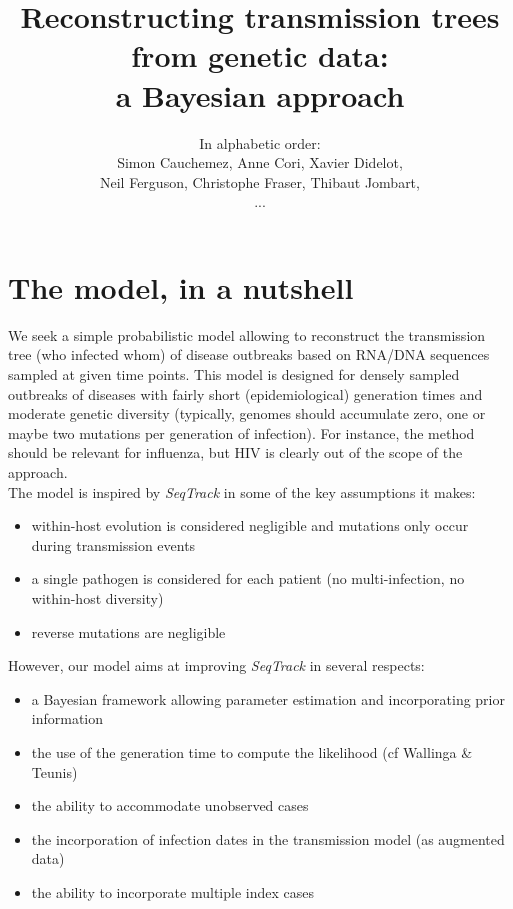 \documentclass[10pt]{article}
\author{In alphabetic order: \\Simon Cauchemez, Anne Cori, Xavier Didelot, \\Neil Ferguson, Christophe Fraser, Thibaut Jombart,\\...}
\title{Reconstructing transmission trees from genetic data: \\a Bayesian approach}
\begin{document}
\maketitle

\section*{The model, in a nutshell}








We seek a simple probabilistic model allowing to reconstruct the transmission tree (who infected whom) of disease outbreaks based on RNA/DNA sequences sampled at given time points.
This model is designed for densely sampled outbreaks of diseases with fairly short (epidemiological) generation times and moderate genetic diversity (typically, genomes should accumulate zero, one or maybe two mutations per generation of infection).
For instance, the method should be relevant for influenza, but HIV is clearly out of the scope of the approach.
\\

The model is inspired by \textit{SeqTrack} in some of the key assumptions it makes: 
\begin{itemize}
\item within-host evolution is considered negligible and mutations only occur during transmission events
\item a single pathogen is considered for each patient (no multi-infection, no within-host diversity)
\item reverse mutations are negligible
\end{itemize}

However, our model aims at improving \textit{SeqTrack} in several respects:
\begin{itemize}
\item a Bayesian framework allowing parameter estimation and incorporating prior information
\item the use of the generation time to compute the likelihood (cf Wallinga \& Teunis)
\item the ability to accommodate unobserved cases
\item the incorporation of infection dates in the transmission model (as augmented data)
\item the ability to incorporate multiple index cases
\end{itemize}
\end{document}
